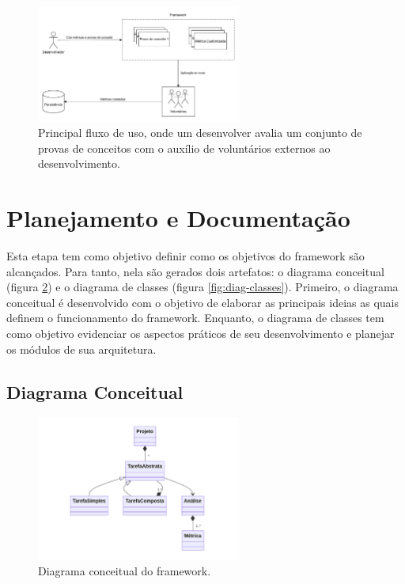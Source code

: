 \documentclass[12pt]{tcc}
\begin{document}
\begin{figure}[!ht]
	\centering
	\includegraphics[width=0.6\textwidth]{figures/diagrama-informal.pdf}
	\caption{Principal fluxo de uso, onde um desenvolver avalia um conjunto de provas de conceitos com o auxílio de voluntários externos ao desenvolvimento.}
	\label{fig:diagrama-informal}
\end{figure}

\section{Planejamento e Documentação}
\label{sec:planejamento-doc}

Esta etapa tem como objetivo definir como os objetivos do framework são alcançados.
Para tanto, nela são gerados dois artefatos: o diagrama conceitual (figura \ref{fig:diag-conceitual}) e o diagrama de classes (figura  \ref{fig:diag-classes}).
Primeiro, o diagrama conceitual é desenvolvido com o objetivo de elaborar as principais ideias as quais definem o funcionamento do framework.
Enquanto, o diagrama de classes tem como objetivo evidenciar os aspectos práticos de seu desenvolvimento e planejar os módulos de sua arquitetura.

\subsection{Diagrama Conceitual}

\begin{figure}[!ht]
	\centering
	\includegraphics[width=0.6\textwidth]{figures/diagrama-conceitual.pdf}
	\caption{Diagrama conceitual do framework.}
	\label{fig:diag-conceitual}
\end{figure}
\end{document}
